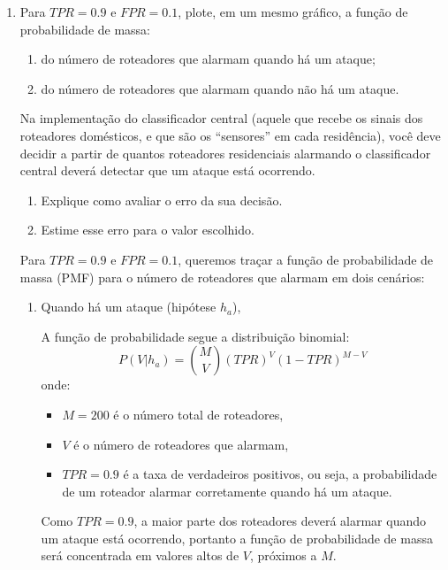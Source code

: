 \documentclass[12 pt]{article}
\begin{document}
\begin{enumerate}
    \item Para $TPR = 0.9$ e $FPR = 0.1$, plote, em um mesmo gráfico, a função de probabilidade de massa:
    \begin{enumerate}
        \item do número de roteadores que alarmam quando há um ataque;
        \item do número de roteadores que alarmam quando não há um ataque.
    \end{enumerate}
    Na implementação do classificador central (aquele que recebe os sinais dos roteadores domésticos, e que são os “sensores” em cada residência), você deve decidir a partir de quantos roteadores residenciais alarmando o classificador central deverá detectar que um ataque está ocorrendo.
    \begin{enumerate}
        \item Explique como avaliar o erro da sua decisão.
        \item Estime esse erro para o valor escolhido.
    \end{enumerate}


    \begin{tcolorbox}[colback=white, colframe=black, title=Resposta:]

        Para \( TPR = 0.9 \) e \( FPR = 0.1 \), queremos traçar a função de probabilidade de massa (PMF) para o número de roteadores que alarmam em dois cenários:
        
        \begin{enumerate}
            \item Quando há um ataque (hipótese \( h_a \)),
            
            A função de probabilidade segue a distribuição binomial:
            $$
            P(V | h_a) = \binom{M}{V} (TPR)^V (1 - TPR)^{M - V}
            $$
            onde:
            \begin{itemize}
                \item \( M = 200 \) é o número total de roteadores,
                \item \( V \) é o número de roteadores que alarmam,
                \item \( TPR = 0.9 \) é a taxa de verdadeiros positivos, ou seja, a probabilidade de um roteador alarmar corretamente quando há um ataque.
            \end{itemize}
            
            Como \( TPR = 0.9 \), a maior parte dos roteadores deverá alarmar quando um ataque está ocorrendo, portanto a função de probabilidade de massa será concentrada em valores altos de \( V \), próximos a \( M \).


\end{enumerate}
\end{tcolorbox}
\end{enumerate}
\end{document}

